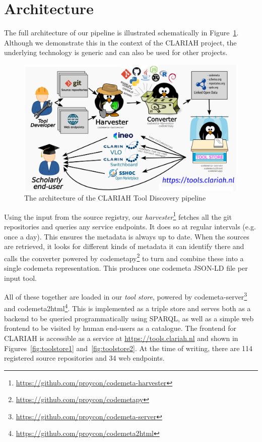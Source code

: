 \documentclass[a4paper,11pt]{article}
\begin{document}
\section{Architecture}

The full architecture of our pipeline is illustrated schematically in
Figure~\ref{fig:architecture}. Although we demonstrate this in the context of the
CLARIAH project, the underlying technology is generic and can also be used for
other projects.

\begin{figure}[h]
\begin{center}
\includegraphics[width=14.0cm]{architecture.png}
\caption{The architecture of the CLARIAH Tool Discovery pipeline}
\end{center}
\label{fig:architecture}
\end{figure}

Using the input from the source registry, our
\emph{harvester}\footnote{\url{https://github.com/proycon/codemeta-harvester}} \citep{CODEMETAHARVESTER} fetches all the git
repositories and queries any service endpoints. It does so at regular intervals
(e.g. once a day). This ensures the metadata is always up to date. When the
sources are retrieved, it looks for different kinds of metadata it can identify
there and calls the converter powered by codemetapy\footnote{\url{https://github.com/proycon/codemetapy}} \citep{CODEMETAPY}
to turn and combine these into a single codemeta representation. This produces
one codemeta JSON-LD file per input tool. 

All of these together are loaded in our \emph{tool store}, powered by codemeta-server\footnote{\url{https://github.com/proycon/codemeta-server}} \citep{CODEMETASERVER} and codemeta2html\footnote{\url{https://github.com/proycon/codemeta2html}}. This is
implemented as a triple store and serves both as a backend to be queried
programmatically using SPARQL, as well as a simple web frontend to be visited
by human end-users as a catalogue. The frontend for CLARIAH is
accessible as a service at \url{https://tools.clariah.nl} and shown in 
Figures~\ref{fig:toolstore1} and~\ref{fig:toolstore2}.
At the time of writing, there are 114 registered source repositories and 34 web endpoints.
\end{document}
